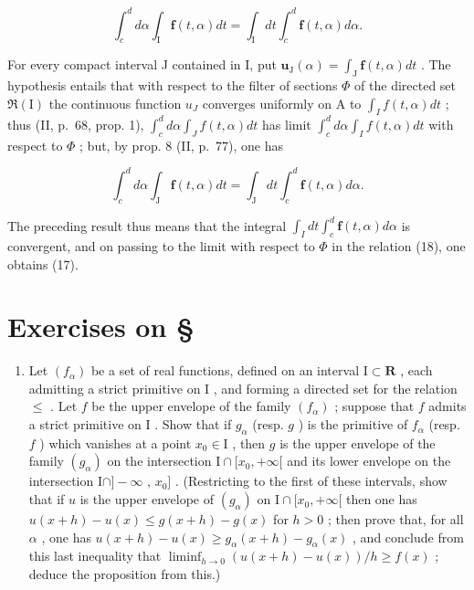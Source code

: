 \[
\int_ {c} ^ {d} d \alpha \int_ {\mathrm{I}} \mathbf {f} (t, \alpha) d t = \int_ {\mathrm{I}} d t \int_ {c} ^ {d} \mathbf {f} (t, \alpha) d \alpha .\tag{17}
\]

For every compact interval J contained in I, put \(\mathbf{u}_{\mathrm{J}}(\alpha) = \int_{\mathrm{J}} \mathbf{f}(t, \alpha) dt\) . The hypothesis entails that with respect to the filter of sections \(\Phi\) of the directed set \(\Re(\mathrm{I})\) the continuous function \(u_{J}\) converges uniformly on A to \(\int_{I} f(t, \alpha) dt\) ; thus (II, p.~68, prop. 1), \(\int_{c}^{d} d\alpha \int_{J} f(t, \alpha) dt\) has limit \(\int_{c}^{d} d\alpha \int_{I} f(t, \alpha) dt\) with respect to \(\Phi\) ; but, by prop. 8 (II, p.~77), one has

\[
\int_ {c} ^ {d} d \alpha \int_ {\mathrm{J}} \mathbf {f} (t, \alpha) d t = \int_ {\mathrm{J}} d t \int_ {c} ^ {d} \mathbf {f} (t, \alpha) d \alpha .\tag{18}
\]

The preceding result thus means that the integral \(\int_{I} dt \int_{c}^{d} \mathbf{f}(t, \alpha) d\alpha\) is convergent, and on passing to the limit with respect to \(\Phi\) in the relation (18), one obtains (17).

\setcounter{exercisegroup}{0}
\section*{Exercises on \S{}}
{}

\begin{enumerate}
\def\labelenumi{\arabic{enumi})}
\tightlist
\item
  Let \((f_{\alpha})\) be a set of real functions, defined on an interval \(\mathrm{I} \subset \mathbf{R}\) , each admitting a strict primitive on \(\mathrm{I}\) , and forming a directed set for the relation \(\leqslant\) . Let \(f\) be the upper envelope of the family \((f_{\alpha})\) ; suppose that \(f\) admits a strict primitive on \(\mathrm{I}\) . Show that if \(g_{\alpha}\) (resp. \(g\) ) is the primitive of \(f_{\alpha}\) (resp. \(f\) ) which vanishes at a point \(x_0 \in \mathrm{I}\) , then \(g\) is the upper envelope of the family \((g_{\alpha})\) on the intersection \(\mathrm{I} \cap [x_0, +\infty[\) and its lower envelope on the intersection \(\mathrm{I} \cap ] - \infty\) , \(x_0]\) . (Restricting to the first of these intervals, show that if \(u\) is the upper envelope of \((g_{\alpha})\) on \(\mathrm{I} \cap [x_0, +\infty[\) then one has \(u(x + h) - u(x) \leqslant g(x + h) - g(x)\) for \(h > 0\) ; then prove that, for all \(\alpha\) , one has \(u(x + h) - u(x) \geqslant g_{\alpha}(x + h) - g_{\alpha}(x)\) , and conclude from this last inequality that \(\liminf_{h \to 0} (u(x + h) - u(x))/h \geqslant f(x)\) ; deduce the proposition from this.)
\end{enumerate}

